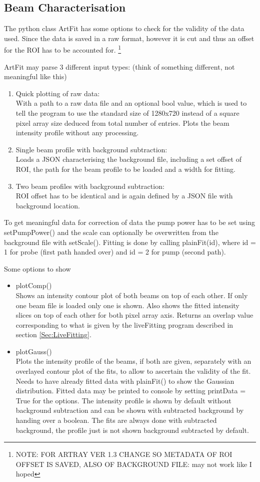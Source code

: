\documentclass[twoside,openright]{scrreprt}
\begin{document}
\subsection{Beam Characterisation}
The python class ArtFit has some options to check for the validity of the data used. Since the data is saved in a raw format, however it is cut and thus an offset for the ROI has to be accounted for. \footnote{NOTE: FOR ARTRAY VER 1.3 CHANGE SO METADATA OF ROI OFFSET IS SAVED, ALSO OF BACKGROUND FILE: may not work like I hoped}

ArtFit may parse 3 different input types: (think of something different, not meaningful like this)
\begin{enumerate}
\item Quick plotting of raw data:\\
With a path to a raw data file and an optional bool value, which is used to tell the program to use the standard size of 1280x720 instead of a square pixel array size deduced from total number of entries. Plots the beam intensity profile without any processing.
\item Single beam profile with background subtraction: \\
Loads a JSON characterising the background file, including a set offset of ROI, the path for the beam profile to be loaded and a width for fitting.
\item Two beam profiles with background subtraction: \\
ROI offset has to be identical and is again defined by a JSON file with background location.
\end{enumerate}

To get meaningful data for correction of data the pump power has to be set using setPumpPower() and the scale can optionally be overwritten from the background file with setScale(). Fitting is done by calling plainFit(id), where id = 1 for probe (first path handed over) and id = 2 for pump (second path).

Some options to show 
\begin{itemize}
\item plotComp()\\
Shows an intensity contour plot of both beams on top of each other. If only one beam file is loaded only one is shown. Also shows the fitted intensity slices on top of each other for both pixel array axis. Returns an overlap value corresponding to what is given by the liveFitting program described in section \ref{Sec:LiveFitting}.
\item plotGauss()\\
Plots the intensity profile of the beams, if both are given, separately with an overlayed contour plot of the fits, to allow to ascertain the validity of the fit. Needs to have already fitted data with plainFit() to show the Gaussian distribution. Fitted data may be printed to console by setting printData = True for the options. The intensity profile is shown by default without background subtraction and can be shown with subtracted background by handing over a boolean. The fits are always done with subtracted background, the profile just is not shown background subtracted by default.
\end{itemize}
\end{document}
